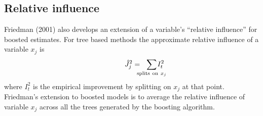 \documentclass{article}
\begin{document}
\subsection{Relative influence}
Friedman (2001) also develops an extension of a variable's ``relative
influence'' for boosted estimates. For tree based methods the
approximate relative influence of a variable $x_j$ is
\begin{equation} 
\label{RelInfluence} 
\hspace{0.5in} 
\hat J_j^2 = \hspace{-0.1in}\sum_{\mathrm{splits~on~}x_j}\hspace{-0.2in}I_t^2
\end{equation}
where $I_t^2$ is the empirical improvement by splitting on $x_j$ at
that point. Friedman's extension to boosted models is to average the
relative influence of variable $x_j$ across all the trees generated by
the boosting algorithm.
\end{document}
